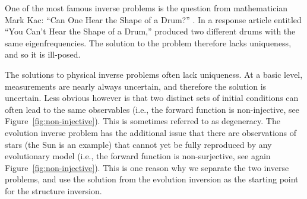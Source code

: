 One of the most famous inverse problems is the question from mathematician Mark Kac: ``Can One Hear the Shape of a Drum?'' \citep{10.2307/2313748}. 
In a response article entitled ``You Can't Hear the Shape of a Drum,'' \citet{10.2307/29775597} produced two different drums with the same eigenfrequencies. 
The solution to the problem therefore lacks uniqueness, and so it is ill-posed. 

The solutions to physical inverse problems often lack uniqueness. 
At a basic level, measurements are nearly always uncertain, and therefore the solution is uncertain. 
Less obvious however is that two distinct sets of initial conditions can often lead to the same observables (i.e., the forward function is non-injective, see Figure~\ref{fig:non-injective}). 
This is sometimes referred to as degeneracy. 
The evolution inverse problem has the additional issue that there are observations of stars (the Sun is an example) that cannot yet be fully reproduced by any evolutionary model (i.e., the forward function is non-surjective, see again Figure~\ref{fig:non-injective}). 
This is one reason why we separate the two inverse problems, and use the solution from the evolution inversion as the starting point for the structure inversion. 

